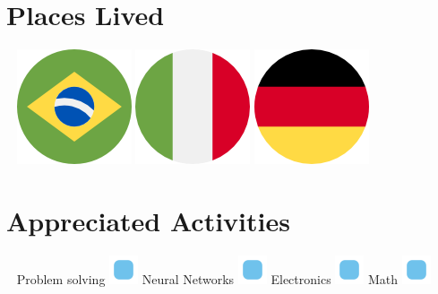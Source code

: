 \documentclass[]{friggeri-cv}
\begin{document}
\begin{aside}
	\section{Places Lived}
		~
		\includegraphics[scale=0.03]{img/brazil.png}    \includegraphics[scale=0.03]{img/italy.png}   \includegraphics[scale=0.03]{img/germany.png}
    	~
    \section{Appreciated Activities}
    	~
	    Problem solving \includegraphics[scale=0.40]{img/point.png}
	    Neural Networks \includegraphics[scale=0.40]{img/point.png}
	    Electronics \includegraphics[scale=0.40]{img/point.png}
	    Math \includegraphics[scale=0.40]{img/point.png}
	    ~
\end{aside}
~
\end{document}

